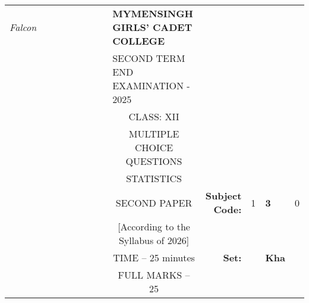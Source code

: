\documentclass[12pt]{exam}
\begin{document}
\begin{table}[]
\begin{tabular}{llllllllcllll}
\textit{Falcon} &  &  &  &  &  &  &  & \multicolumn{1}{l}{\textbf{MYMENSINGH GIRLS' CADET COLLEGE}} &                                             &                        &                                 &                        \\
                &  &  &  &  &  &  &  & \multicolumn{1}{l}{SECOND TERM END EXAMINATION - 2025}       &                                             &                        & \multicolumn{1}{c}{}            &                        \\
                &  &  &  &  &  &  &  & CLASS: XII                                                   &                                             &                        & \multicolumn{1}{c}{}            &                        \\
                &  &  &  &  &  &  &  & MULTIPLE CHOICE QUESTIONS                                    &                                             &                        & \multicolumn{1}{c}{}            &                        \\
                &  &  &  &  &  &  &  & STATISTICS                                                   &                                             &                        & \multicolumn{1}{r}{}            &                        \\ \cline{11-13} 
                &  &  &  &  &  &  &  & SECOND PAPER                                                 & \multicolumn{1}{r|}{\textbf{Subject Code:}} & \multicolumn{1}{l|}{1} & \multicolumn{1}{l|}{\textbf{3}} & \multicolumn{1}{l|}{0} \\ \cline{11-13} 
                &  &  &  &  &  &  &  & [According to the Syllabus of 2026]                          & \multicolumn{1}{r}{}                        &                        &                                 &                        \\ \cline{12-12}
                &  &  &  &  &  &  &  & TIME – 25 minutes                                            & \multicolumn{1}{r}{\textbf{Set:}}           & \multicolumn{1}{l|}{}  & \multicolumn{1}{l|}{\textbf{Kha}} &                        \\ \cline{12-12}
                &  &  &  &  &  &  &  & FULL MARKS – 25                                              &                                             &                        &                                 &                       
\end{tabular}
\end{table}
\end{document}
